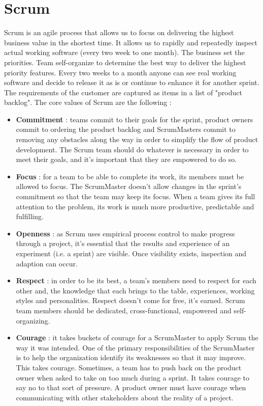 \section{Scrum}
Scrum is an agile process that allows us to focus on delivering the highest business value in the shortest time. It allows us to rapidly and repeatedly inspect actual working software (every two week to one month). The business set the priorities. Team self-organize to determine the best way to deliver the highest priority features. Every two weeks to a month anyone can see real working software and decide to release it as is or continue to enhance it for another sprint. The requirements of the customer are captured as items in a list of "product backlog". The core values of Scrum are the following :
\begin{itemize}
    \item \textbf{Commitment} : teams commit to their goals for the sprint, product owners commit to ordering the product backlog and ScrumMasters commit to removing any obstacles along the way in order to simplify the flow of product development. The Scrum team should do whatever is necessary in order to meet their goals, and it's important that they are empowered to do so.
    \item \textbf{Focus} : for a team to be able to complete its work, its members must be allowed to focus. The ScrumMaster doesn't allow changes in the sprint's commitment so that the team may keep its focus. When a team gives its full attention to the problem, its work is much more productive, predictable and fulfilling.
    \item \textbf{Openness} : as Scrum uses empirical process control to make progress through a project, it's essential that the results and experience of an experiment (i.e. a sprint) are visible. Once visibility exists, inspection and adaption can occur.
    \item \textbf{Respect} : in order to be its best, a team's members need to respect for each other and, the knowledge that each brings to the table, experiences, working styles and personalities. Respect doesn't come for free, it's earned. Scrum team members should be dedicated, cross-functional, empowered and self-organizing.
    \item \textbf{Courage} : it takes buckets of courage for a ScrumMaster to apply Scrum the way it was intended. One of the primary responsibilities of the ScrumMaster is to help the organization identify its weaknesses so that it may improve. This takes courage. Sometimes, a team has to push back on the product owner when asked to take on too much during a sprint. It takes courage to say no to that sort of pressure. A product owner must have courage when communicating with other stakeholders about the reality of a project.
\end{itemize}

